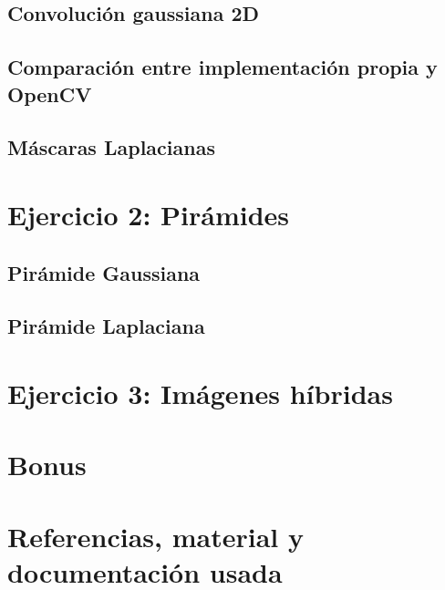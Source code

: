 \documentclass[12pt, spanish]{article}
\begin{document}
\subsection{Convolución gaussiana 2D}

\subsection{Comparación entre implementación propia y OpenCV}

\subsection{Máscaras Laplacianas}



\section{Ejercicio 2: Pirámides}

\subsection{Pirámide Gaussiana}

\subsection{Pirámide Laplaciana}



\section{Ejercicio 3: Imágenes híbridas}



\section{Bonus}

\newpage

\section{Referencias, material y documentación usada}


\begin{thebibliography}{9}

\end{thebibliography}
\end{document}
